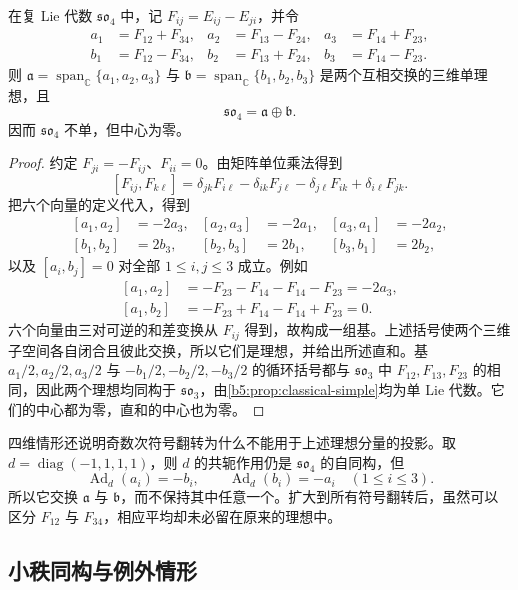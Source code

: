 \begin{proposition}\label{b5:prop:so4-explicit-ideals}
	在复 Lie 代数 \(\mathfrak{so}_4\) 中，记 \(F_{ij}=E_{ij}-E_{ji}\)，并令
	\[
		\begin{aligned}
			a_1&=F_{12}+F_{34},&a_2&=F_{13}-F_{24},&a_3&=F_{14}+F_{23},\\
			b_1&=F_{12}-F_{34},&b_2&=F_{13}+F_{24},&b_3&=F_{14}-F_{23}.
		\end{aligned}
	\]
	则 \(\mathfrak a=\operatorname{span}_{\mathbb C}\{a_1,a_2,a_3\}\) 与 \(\mathfrak b=\operatorname{span}_{\mathbb C}\{b_1,b_2,b_3\}\) 是两个互相交换的三维单理想，且
	\[
		\mathfrak{so}_4=\mathfrak a\oplus\mathfrak b.
	\]
	因而 \(\mathfrak{so}_4\) 不单，但中心为零。
\end{proposition}
\begin{proof}
	约定 \(F_{ji}=-F_{ij}\)、\(F_{ii}=0\)。由矩阵单位乘法得到
	\[
		[F_{ij},F_{k\ell}] =\delta_{jk}F_{i\ell}-\delta_{ik}F_{j\ell} -\delta_{j\ell}F_{ik}+\delta_{i\ell}F_{jk}.
	\]
	把六个向量的定义代入，得到
	\[
		\begin{aligned}
			[a_1,a_2]&=-2a_3,&[a_2,a_3]&=-2a_1,&[a_3,a_1]&=-2a_2,\\
			[b_1,b_2]&=2b_3,&[b_2,b_3]&=2b_1,&[b_3,b_1]&=2b_2,
		\end{aligned}
	\]
	以及 \([a_i,b_j]=0\) 对全部 \(1\le i,j\le3\) 成立。例如
	\[
		\begin{aligned}
			[a_1,a_2]&=-F_{23}-F_{14}-F_{14}-F_{23}=-2a_3,\\
			[a_1,b_2]&=-F_{23}+F_{14}-F_{14}+F_{23}=0.
		\end{aligned}
	\]
	六个向量由三对可逆的和差变换从 \(F_{ij}\) 得到，故构成一组基。上述括号使两个三维子空间各自闭合且彼此交换，所以它们是理想，并给出所述直和。基 \(a_1/2,a_2/2,a_3/2\) 与 \(-b_1/2,-b_2/2,-b_3/2\) 的循环括号都与 \(\mathfrak{so}_3\) 中 \(F_{12},F_{13},F_{23}\) 的相同，因此两个理想均同构于 \(\mathfrak{so}_3\)，由\cref{b5:prop:classical-simple}均为单 Lie 代数。它们的中心都为零，直和的中心也为零。
\end{proof}

四维情形还说明奇数次符号翻转为什么不能用于上述理想分量的投影。取 \(d=\operatorname{diag}(-1,1,1,1)\)，则 \(d\) 的共轭作用仍是 \(\mathfrak{so}_4\) 的自同构，但
\[
	\operatorname{Ad}_d(a_i)=-b_i,\qquad \operatorname{Ad}_d(b_i)=-a_i\quad(1\le i\le3).
\]
所以它交换 \(\mathfrak a\) 与 \(\mathfrak b\)，而不保持其中任意一个。扩大到所有符号翻转后，虽然可以区分 \(F_{12}\) 与 \(F_{34}\)，相应平均却未必留在原来的理想中。

\subsection{小秩同构与例外情形}
\label{b5:subsec:1304:03}

